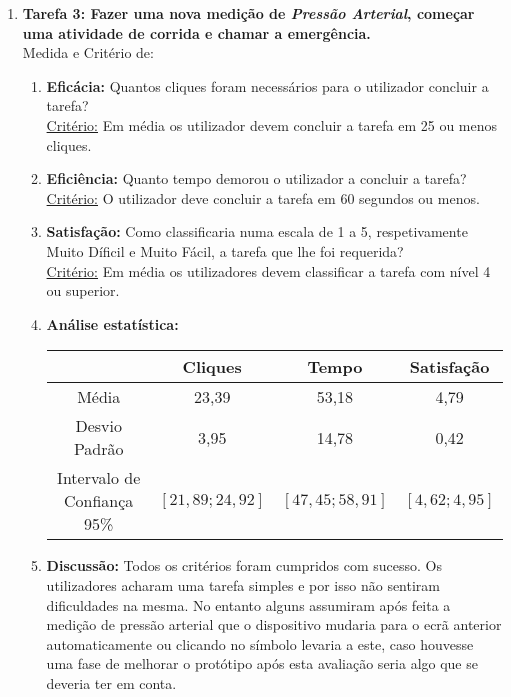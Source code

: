\documentclass[11pt]{article}
\begin{document}
\begin{enumerate}
        \item \textbf{Tarefa 3: Fazer uma nova medição de \emph{Pressão Arterial}, começar uma atividade de corrida e chamar a emergência.} \\
        Medida e Critério de:
        \begin{enumerate}
            \item \textbf{Eficácia:} Quantos cliques foram necessários para o utilizador concluir a tarefa?\\
            \underline{Critério:} Em média os utilizador devem concluir a tarefa em 25 ou menos cliques.
            
            \item \textbf{Eficiência:} Quanto tempo demorou o utilizador a concluir a tarefa?\\
            \underline{Critério:} O utilizador deve concluir a tarefa em 60 segundos ou menos.
            
            \item \textbf{Satisfação:} Como classificaria numa escala de 1 a 5, respetivamente Muito Díficil e Muito Fácil, a tarefa que lhe foi requerida?\\
            \underline{Critério:} Em média os utilizadores devem classificar a tarefa com nível 4 ou superior.
            
            \item \textbf{Análise estatística:} \\
\begin{center}
 \begin{tabular}{|c | c c c|} 
 \hline
   & Cliques & Tempo & Satisfação \\ [0.5ex] 
 \hline
 Média & 23,39 & 53,18 & 4,79 \\ 
 \hline
 Desvio Padrão & 3,95 & 14,78 & 0,42 \\
 \hline
 Intervalo de Confiança 95\% & $[21,89;24,92]$ & $[47,45;58,91]$ & $[4,62;4,95]$ \\

 \hline
\end{tabular}
\end{center}
            
            \item \textbf{Discussão:} Todos os critérios foram cumpridos com sucesso.
            Os utilizadores acharam uma tarefa simples e por isso não sentiram dificuldades na mesma. No entanto alguns assumiram após feita a medição de pressão arterial que o dispositivo mudaria para o ecrã anterior automaticamente ou clicando no símbolo levaria a este, caso houvesse uma fase de melhorar o protótipo após esta avaliação seria algo que se deveria ter em conta.
        \end{enumerate}
    \end{enumerate}
\end{document}
